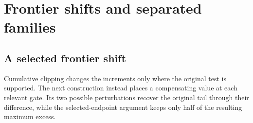 \section{Frontier shifts and separated families}\label{sec:primal-additions}

\subsection{A selected frontier shift}\label{clip:frontier}

Cumulative clipping changes the increments only where the original
test is supported. The next construction instead places a compensating
value at each relevant gate. Its two possible perturbations recover
the original tail through their difference, while the selected-endpoint
argument keeps only half of the resulting maximum excess.

